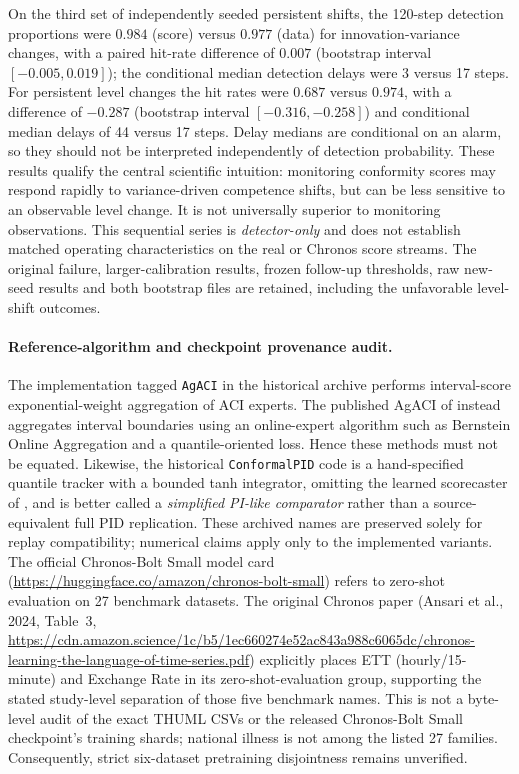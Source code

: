 \documentclass[10pt]{article}
\begin{document}
On the third set of independently seeded persistent shifts, the
120-step detection proportions were $0.984$ (score) versus $0.977$
(data) for innovation-variance changes, with a paired hit-rate
difference of $0.007$ (bootstrap interval $[-0.005,0.019]$);
the conditional median detection delays were 3 versus 17 steps.
For persistent level changes the hit rates were $0.687$ versus
$0.974$, with a difference of $-0.287$ (bootstrap interval
$[-0.316,-0.258]$) and conditional median delays of 44 versus
17 steps. Delay medians are conditional on an alarm, so they should
not be interpreted independently of detection probability.
These results qualify the central scientific intuition: monitoring
conformity scores may respond rapidly to variance-driven competence
shifts, but can be less sensitive to an observable level change.
It is not universally superior to monitoring observations. This
sequential series is \emph{detector-only} and does not establish
matched operating characteristics on the real or Chronos score
streams. The original failure, larger-calibration results, frozen
follow-up thresholds, raw new-seed results and both bootstrap files
are retained, including the unfavorable level-shift outcomes.

\paragraph{Reference-algorithm and checkpoint provenance audit.}
The implementation tagged \texttt{AgACI} in the historical archive
performs interval-score exponential-weight aggregation of ACI experts.
The published AgACI of \citet{zaffran2022adaptive} instead aggregates
interval boundaries using an online-expert algorithm such as Bernstein
Online Aggregation and a quantile-oriented loss. Hence these methods
must not be equated. Likewise, the historical \texttt{ConformalPID}
code is a hand-specified quantile tracker with a bounded tanh
integrator, omitting the learned scorecaster of
\citet{angelopoulos2023conformal}, and is better called a
\emph{simplified PI-like comparator} rather than a source-equivalent
full PID replication. These archived names are preserved solely for
replay compatibility; numerical claims apply only to the implemented
variants. The official Chronos-Bolt Small model card
(\url{https://huggingface.co/amazon/chronos-bolt-small}) refers to
zero-shot evaluation on 27 benchmark datasets. The original Chronos
paper (Ansari et al., 2024, Table~3, \url{https://cdn.amazon.science/1c/b5/1ec660274e52ac843a988c6065dc/chronos-learning-the-language-of-time-series.pdf})
explicitly places ETT (hourly/15-minute) and Exchange Rate in its
zero-shot-evaluation group, supporting the stated study-level separation
of those five benchmark names. This is not a byte-level audit of the
exact THUML CSVs or the released Chronos-Bolt Small checkpoint's
training shards; national illness is not among the listed 27 families.
Consequently, strict six-dataset pretraining disjointness remains unverified.
\end{document}
